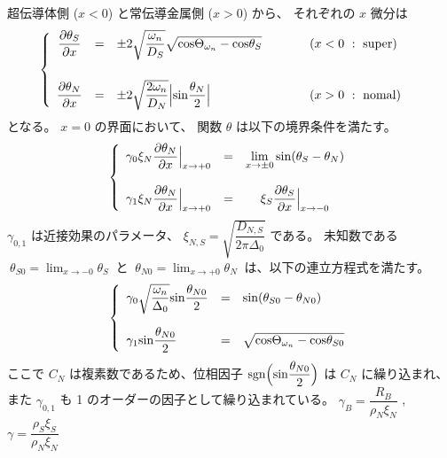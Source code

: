 \documentclass[uplatex,a4j,12pt,dvipdfmx]{jsarticle}
\begin{document}
超伝導体側 ($x<0$) と常伝導金属側 ($x>0$) から、
それぞれの $x$ 微分は
\begin{eqnarray}
	\left\{
	\begin{array}{clllc}
		\dfrac{\partial \theta_{S}}{\partial x}
		 & =                        &
		\pm 2
		\sqrt{
			\dfrac{\omega_{n}}{D_{S}}
		}
		\sqrt{
		{\rm cos} \Theta_{\omega_{n}}
		-
		{\rm cos} \theta_{S}
		}
		\hspace{10mm}
		 & (x<0 \ : \ {\rm super})  &
		\\[8mm]
		\dfrac{\partial \theta_{N}}{\partial x}
		 & =                        &
		\pm
		2 \sqrt{ \dfrac{2 \omega_{n}}{D_{N}} } \Big| {\rm sin} \dfrac{\theta_{N}}{2} \Big|
		\hspace{10mm}
		 & (x>0 \ : \ {\rm nomal} ) &
	\end{array}
	\right.
\end{eqnarray}
となる。
$x=0$ の界面において、
関数 $\theta$ は以下の境界条件を満たす。
\begin{eqnarray}
	\left\{
	\begin{array}{clc}
		\gamma_{0} \xi_{N}
		\dfrac{\partial \theta_{N}}{\partial x}
		\Big|_{x \to +0}
		 & = &
		\displaystyle
		\lim_{x \to \pm0}
		{\rm sin}(\theta_{S} - \theta_{N})
		\\[6mm]
		\gamma_{1} \xi_{N}
		\dfrac{\partial \theta_{N}}{\partial x}
		\Big|_{x \to +0}
		 & = &
		\xi_{S}
		\dfrac{\partial \theta_{S}}{\partial x}
		\Big|_{x \to -0}
	\end{array}
	\right.
\end{eqnarray}
$\gamma_{0,1}$ は近接効果のパラメータ、
$ \xi_{N,S} = \sqrt{\dfrac{D_{N,S}}{2 \pi \Delta_{0}}} $
である。
未知数である
$ \ \theta_{S0}=\displaystyle \lim_{x \to -0} \theta_{S} \ $
と
$ \ \theta_{N0}=\displaystyle \lim_{x \to +0} \theta_{N} \ $
は、以下の連立方程式を満たす。
\begin{eqnarray}
	\left\{
	\begin{array}{lcl}
		\gamma_{0}
		\sqrt{ \dfrac{\omega_{n}}{\Delta_{0}} } {\rm sin} \dfrac{\theta_{N0}}{2}
		 & = &
		{\rm sin}(\theta_{S0} - \theta_{N0})
		\\[6mm]
		\gamma_{1}
		{\rm sin} \dfrac{\theta_{N0}}{2}
		 & = &
		\sqrt{
		{\rm cos} \Theta_{\omega_{n}}
		-
		{\rm cos} \theta_{S0}
		}
	\end{array}
	\right.
\end{eqnarray}
ここで
$C_{N}$ は複素数であるため、位相因子
${\rm sgn} \Big( {\rm sin} \dfrac{\theta_{N0}}{2} \Big)$
は $C_{N}$ に繰り込まれ、
また $\gamma_{0,1}$ も 1 のオーダーの因子として繰り込まれている。
$ \gamma_{B} = \dfrac{R_{B}}{\rho_{N} \xi_{N}} $
,
$ \gamma = \dfrac{\rho_{S} \xi_{S}}{\rho_{N} \xi_{N}} $
\end{document}
